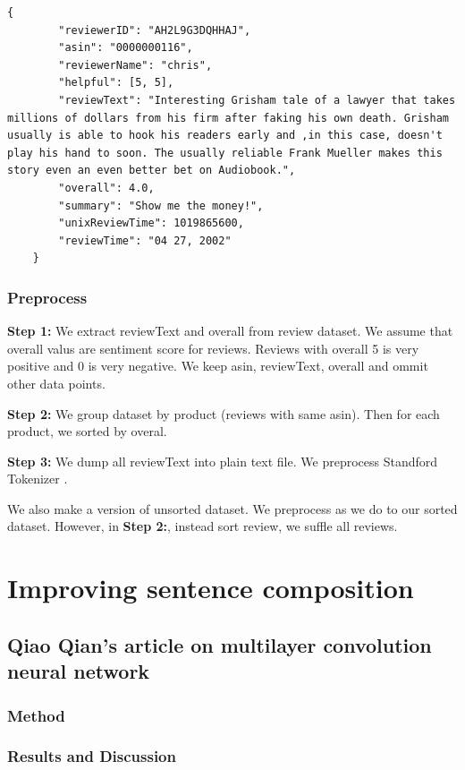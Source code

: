 \begin{lstlisting}[caption={Amazon reviews sample},label={lst:amzreview}]
	{
		"reviewerID": "AH2L9G3DQHHAJ",
		"asin": "0000000116",
		"reviewerName": "chris",
		"helpful": [5, 5],
		"reviewText": "Interesting Grisham tale of a lawyer that takes millions of dollars from his firm after faking his own death. Grisham usually is able to hook his readers early and ,in this case, doesn't play his hand to soon. The usually reliable Frank Mueller makes this story even an even better bet on Audiobook.",
		"overall": 4.0,
		"summary": "Show me the money!",
		"unixReviewTime": 1019865600,
		"reviewTime": "04 27, 2002"
	}
\end{lstlisting}

\subsubsection{Preprocess}
\textbf{Step 1:}
We extract reviewText and overall from review dataset. We assume that overall valus are sentiment score for reviews. Reviews with overall 5 is very positive and 0 is very negative. We keep asin, reviewText, overall and ommit other data points.

\textbf{Step 2:}
We group dataset by product (reviews with same asin). Then for each product, we sorted by overal.

\textbf{Step 3:}
We dump all reviewText into plain text file. We preprocess Standford Tokenizer \cite{tokenizerpart}.

We also make a version of unsorted dataset. We preprocess as we do to our sorted dataset. However, in \textbf{Step 2:}, instead sort review, we suffle all reviews.

\section{Improving sentence composition}
\subsection{Qiao Qian's article on multilayer convolution neural network}
\subsubsection{Method}

\subsubsection{Results and Discussion}


